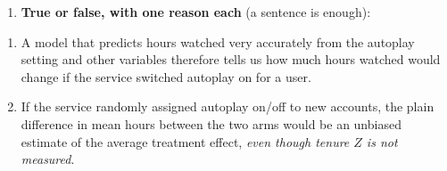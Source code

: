 \documentclass[
  11pt,
]{article}
\providecommand{\tightlist}{%
  \setlength{\itemsep}{0pt}\setlength{\parskip}{0pt}}
\begin{document}
\begin{enumerate}
\def\labelenumi{(\alph{enumi})}
\setcounter{enumi}{1}
\tightlist
\item
  \textbf{True or false, with one reason each} (a sentence is enough):
\end{enumerate}

\begin{enumerate}[label=(\roman*),leftmargin=3.2em,topsep=2pt]
\item A model that predicts hours watched very accurately from the autoplay
  setting and other variables therefore tells us how much hours watched would
  change if the service switched autoplay on for a user.
\item If the service randomly assigned autoplay on/off to new accounts, the
  plain difference in mean hours between the two arms would be an unbiased
  estimate of the average treatment effect, \emph{even though tenure $Z$ is not
  measured}.
\end{enumerate}
\end{document}
